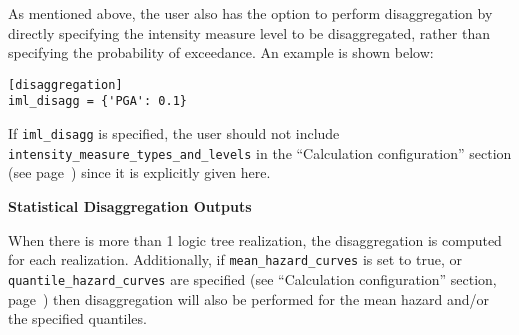 As mentioned above, the user also has the option to perform disaggregation by
directly specifying the intensity measure level to be disaggregated, rather than
specifying the probability of exceedance. An example is shown below:

\begin{verbatim}
[disaggregation]
iml_disagg = {'PGA': 0.1}
\end{verbatim}

If \texttt{iml\_disagg} is specified, the user should not include
 \texttt{intensity\_measure\_types\_and\_levels} in the
``Calculation configuration'' section (see page~\pageref{sec:calculation_configuration})
since it is explicitly given here.

\textbf{Statistical Disaggregation Outputs}

 When there is more than 1 logic tree realization, the disaggregation is
 computed for each realization. Additionally, if \texttt{mean\_hazard\_curves}
 is set to true, or \texttt{quantile\_hazard\_curves} are specified (see
 ``Calculation configuration'' section, page~\pageref{sec:calculation_configuration})
 then disaggregation will also be performed for the mean hazard and/or the
 specified quantiles.